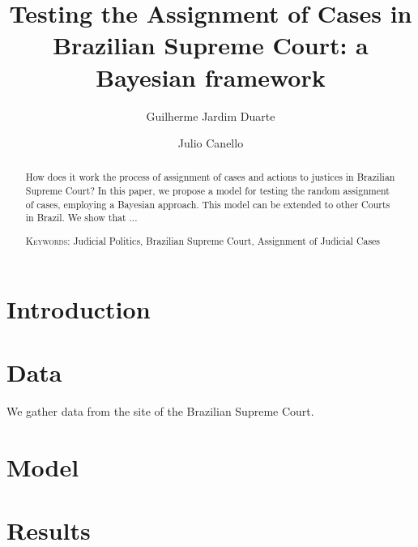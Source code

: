 \documentclass[12pt, a4paper]{article}
\title{\textbf{Testing the Assignment of Cases in Brazilian Supreme Court: a Bayesian framework}}
\author{Guilherme Jardim Duarte  \and Julio Canello}
\begin{document}
\onehalfspacing
\maketitle

\begin{abstract}

How does it work the process of assignment of cases and actions to justices in Brazilian Supreme Court? In this paper, we propose a model for testing the random assignment of cases, employing a Bayesian approach. This model can be extended to other Courts in Brazil. We show that ...




\vspace{.5cm}
\noindent
\textsc{Keywords}: Judicial Politics, Brazilian Supreme Court, Assignment of Judicial Cases
\end{abstract}

\newpage

\linenumbers
\section{Introduction}


\section{Data}


We gather data from the site of the Brazilian Supreme Court.

\section{Model}




\section{Results}


\end{document}

